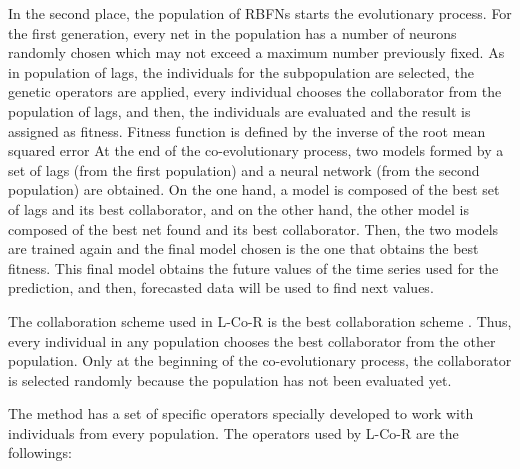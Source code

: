 \documentclass[a4paper,twoside]{article}
\newcommand{\metodo}{L-Co-R}
\begin{document}
In the second place, the population of RBFNs starts the evolutionary process. For the first generation, every net in the population has a number of neurons randomly chosen which may not exceed a maximum number previously fixed. As in population of lags, the individuals for the subpopulation are selected, the genetic operators are applied, every individual chooses the collaborator from the population of lags, and then, the individuals are evaluated and the result is assigned as fitness. Fitness function is defined by the inverse of the root mean squared error
At the end of the co-evolutionary process, two models formed by a set of lags (from the first population) and a neural network (from the second population) are obtained. On the one hand, a model is composed of the best set of lags and its best collaborator, and on the other hand, the other model is composed of the best net found and its best collaborator. Then, the two models are trained again and the final model chosen is the one that obtains the best fitness. This final model obtains the future values of the time series used for the prediction, and then, forecasted data will be used to find next values.

The collaboration scheme used in {\metodo} is the best collaboration scheme \cite{Potter94}. 
Thus, every individual in any population chooses the best collaborator from the other population. Only at the beginning of the co-evolutionary process, the collaborator is selected randomly because the population has not been evaluated yet.

The method has a set of specific operators specially developed to work with individuals from every population. 
The operators used by {\metodo} are the followings:
\end{document}
